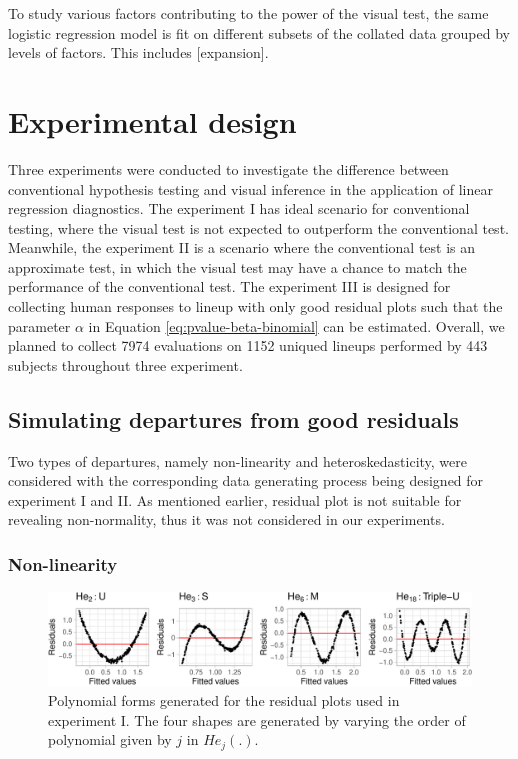 \documentclass[]{interact}
\theoremstyle{plain}%
\theoremstyle{definition}
\theoremstyle{remark}
\begin{document}
To study various factors contributing to the power of the visual test,
the same logistic regression model is fit on different subsets of the
collated data grouped by levels of factors. This includes
{[}expansion{]}.

\hypertarget{experimental-design}{%
\section{Experimental design}\label{experimental-design}}

Three experiments were conducted to investigate the difference between
conventional hypothesis testing and visual inference in the application
of linear regression diagnostics. The experiment I has ideal scenario
for conventional testing, where the visual test is not expected to
outperform the conventional test. Meanwhile, the experiment II is a
scenario where the conventional test is an approximate test, in which
the visual test may have a chance to match the performance of the
conventional test. The experiment III is designed for collecting human
responses to lineup with only good residual plots such that the
parameter \(\alpha\) in Equation \ref{eq:pvalue-beta-binomial} can be
estimated. Overall, we planned to collect 7974 evaluations on 1152
uniqued lineups performed by 443 subjects throughout three experiment.

\hypertarget{simulating-departures-from-good-residuals}{%
\subsection{Simulating departures from good
residuals}\label{simulating-departures-from-good-residuals}}

Two types of departures, namely non-linearity and heteroskedasticity,
were considered with the corresponding data generating process being
designed for experiment I and II. As mentioned earlier, residual plot is
not suitable for revealing non-normality, thus it was not considered in
our experiments.

\hypertarget{non-linearity}{%
\subsubsection{Non-linearity}\label{non-linearity}}

\begin{figure}

{\centering \includegraphics[width=1\linewidth]{paper_comparison_files/figure-latex/different-shape-of-herimite-1} 

}

\caption{Polynomial forms generated for the residual plots used in experiment I. The four shapes are generated by varying the order of polynomial given by $j$ in $He_j(.)$.}\label{fig:different-shape-of-herimite}
\end{figure}
\end{document}
